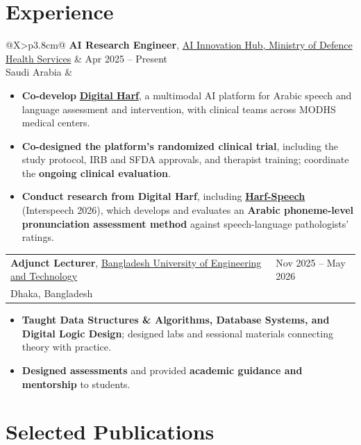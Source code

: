 \documentclass[10pt,letterpaper]{article}
\makeatletter
\newenvironment{highlights}
    {\begin{itemize}[
        topsep=0.18em,
        parsep=0pt,
        partopsep=0pt,
        itemsep=0.42em,
        leftmargin=1.15em
    ]}
    {\end{itemize}}
\newenvironment{entry}
    {\begin{minipage}{\linewidth}\color{textColor}}
    {\end{minipage}}
\newcommand{\daterow}[3]{%
    \begin{tabularx}{\linewidth}{@{}X>{\raggedleft\arraybackslash}p{3.8cm}@{}}
        #1 & \textcolor{mutedColor}{#2}\\
        #3 &
    \end{tabularx}
}
\makeatother
\begin{document}
\section{Experience}
\begin{entry}
\daterow
    {\textbf{AI Research Engineer}, \href{https://ai.modhs.med.sa/en}{AI Innovation Hub, Ministry of Defence Health Services}}
    {Apr 2025 -- Present}
    {Saudi Arabia}
\vspace{-0.18em}
\begin{highlights}
    \item \textbf{Co-develop} \href{https://digitalharf.modhs.med.sa/}{\textbf{Digital Harf}}, a multimodal AI platform for Arabic speech and language assessment and intervention, with clinical teams across MODHS medical centers.
    \item \textbf{Co-designed the platform's randomized clinical trial}, including the study protocol, IRB and SFDA approvals, and therapist training; coordinate the \textbf{ongoing clinical evaluation}.
    \item \textbf{Conduct research from Digital Harf}, including \href{https://arxiv.org/abs/2604.06191}{\textbf{Harf-Speech}} (Interspeech 2026), which develops and evaluates an \textbf{Arabic phoneme-level pronunciation assessment method} against speech-language pathologists' ratings.
\end{highlights}
\end{entry}
\vspace{0.85em}

\begin{entry}
\daterow
    {\textbf{Adjunct Lecturer}, \href{https://cse.buet.ac.bd/}{Bangladesh University of Engineering and Technology}}
    {Nov 2025 -- May 2026}
    {Dhaka, Bangladesh}
\vspace{-0.18em}
\begin{highlights}
    \item \textbf{Taught Data Structures \& Algorithms, Database Systems, and Digital Logic Design}; designed labs and sessional materials connecting theory with practice.
    \item \textbf{Designed assessments} and provided \textbf{academic guidance and mentorship} to students.
\end{highlights}
\end{entry}

\section{Selected Publications}
\end{document}
